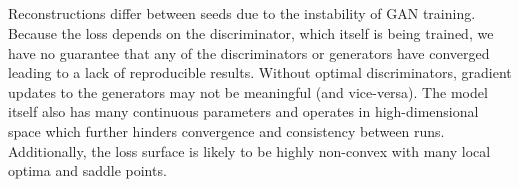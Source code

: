 \documentclass[12pt,letterpaper]{article} %
\begin{document}
\subsection{}
\begin{figure}[ht!]
 \hfill
   \hfill
\end{figure}
Reconstructions differ between seeds due to the instability of GAN training. Because the loss depends on the discriminator, which itself is being trained, we have no guarantee that any of the discriminators or generators have converged leading to a lack of reproducible results. Without optimal discriminators, gradient updates to the generators may not be meaningful (and vice-versa). The model itself also has many continuous parameters and operates in high-dimensional space which further hinders convergence and consistency between runs. Additionally, the loss surface is likely to be highly non-convex with many local optima and saddle points. 
\subsection{}
\begin{figure}[ht!]
 \hfill
   \hfill
\end{figure}
\end{document}
